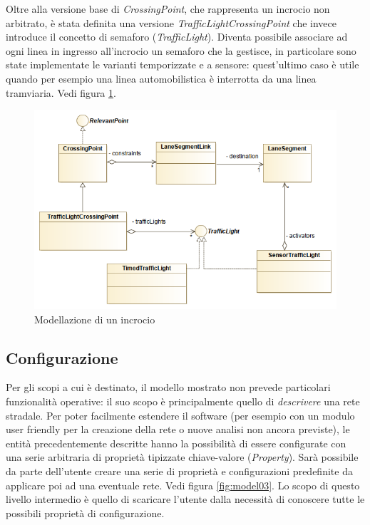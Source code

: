 Oltre alla versione base di \textit{CrossingPoint}, che rappresenta un incrocio non arbitrato, è stata definita una versione \textit{TrafficLightCrossingPoint} che invece introduce il concetto di semaforo (\textit{TrafficLight}).
Diventa possibile associare ad ogni linea in ingresso all'incrocio un semaforo che la gestisce, in particolare sono state implementate le varianti temporizzate e a sensore: quest'ultimo caso è utile quando per esempio una linea automobilistica è interrotta da una linea tramviaria.
Vedi figura \ref{fig:model02}.

\begin{figure}[h]
	\centering
	\includegraphics[scale=0.5]{img/model02}
	\caption{Modellazione di un incrocio}
	\label{fig:model02}
\end{figure}

\subsection{Configurazione}

Per gli scopi a cui è destinato, il modello mostrato non prevede particolari funzionalità operative: il suo scopo è principalmente quello di \textit{descrivere} una rete stradale.
Per poter facilmente estendere il software (per esempio con un modulo user friendly per la creazione della rete o nuove analisi non ancora previste), le entità precedentemente descritte hanno la possibilità di essere configurate con una serie arbitraria di proprietà tipizzate chiave-valore (\textit{Property}).
Sarà possibile da parte dell'utente creare una serie di proprietà e configurazioni predefinite da applicare poi ad una eventuale rete. Vedi figura \ref{fig:model03}.
Lo scopo di questo livello intermedio è quello di scaricare l'utente dalla necessità di conoscere tutte le possibili proprietà di configurazione.

